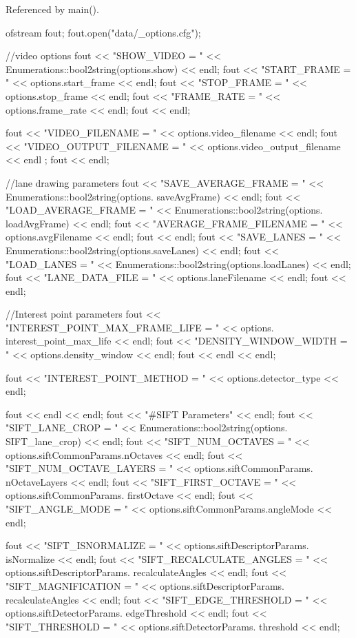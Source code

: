 \-Referenced by main().


\begin{DoxyCode}
                                                 {

    ofstream fout;
    fout.open("data/_options.cfg");

    //video options
    fout << "SHOW_VIDEO     = " << Enumerations::bool2string(options.show) << 
      endl;
    fout << "START_FRAME    = " << options.start_frame << endl;
    fout << "STOP_FRAME     = " << options.stop_frame << endl;
    fout << "FRAME_RATE     = " << options.frame_rate << endl;
    fout << endl;


    fout << "VIDEO_FILENAME = " << options.video_filename << endl;
    fout << "VIDEO_OUTPUT_FILENAME = " << options.video_output_filename << endl
      ;
    fout << endl;

    //lane drawing parameters
    fout << "SAVE_AVERAGE_FRAME     = " << Enumerations::bool2string(options.
      saveAvgFrame) << endl;
    fout << "LOAD_AVERAGE_FRAME     = " << Enumerations::bool2string(options.
      loadAvgFrame) << endl;
    fout << "AVERAGE_FRAME_FILENAME = " << options.avgFilename << endl;
    fout << endl;
    fout << "SAVE_LANES     = " << Enumerations::bool2string(options.saveLanes)
       << endl;
    fout << "LOAD_LANES     = " << Enumerations::bool2string(options.loadLanes)
       << endl;
    fout << "LANE_DATA_FILE = " << options.laneFilename << endl;
    fout << endl;

    //Interest point parameters
    fout << "INTEREST_POINT_MAX_FRAME_LIFE = " << options.
      interest_point_max_life << endl;
    fout << "DENSITY_WINDOW_WIDTH          = " << options.density_window << 
      endl;
    fout << endl << endl;

    fout << "INTEREST_POINT_METHOD = " << options.detector_type << endl;

    fout << endl << endl;
    fout << "#SIFT Parameters" << endl;
    fout << "SIFT_LANE_CROP           = " << Enumerations::bool2string(options.
      SIFT_lane_crop) << endl;
    fout << "SIFT_NUM_OCTAVES         = " << options.siftCommonParams.nOctaves 
      << endl;
    fout << "SIFT_NUM_OCTAVE_LAYERS   = " << options.siftCommonParams.
      nOctaveLayers << endl;
    fout << "SIFT_FIRST_OCTAVE        = " << options.siftCommonParams.
      firstOctave << endl;
    fout << "SIFT_ANGLE_MODE          = " << options.siftCommonParams.angleMode
       << endl;

    fout << "SIFT_ISNORMALIZE         = " << options.siftDescriptorParams.
      isNormalize << endl;
    fout << "SIFT_RECALCULATE_ANGLES  = " << options.siftDescriptorParams.
      recalculateAngles << endl;
    fout << "SIFT_MAGNIFICATION       = " << options.siftDescriptorParams.
      recalculateAngles << endl;
    fout << "SIFT_EDGE_THRESHOLD      = " << options.siftDetectorParams.
      edgeThreshold << endl;
    fout << "SIFT_THRESHOLD           = " << options.siftDetectorParams.
      threshold << endl;

}
\end{DoxyCode}
